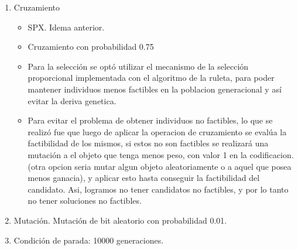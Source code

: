 \documentclass[9pt,conference]{IEEEtran}
\begin{document}
\begin{enumerate}
	\item Cruzamiento\\
		\begin{itemize}	
		\item SPX. Idema anterior.
		\item Cruzamiento con probabilidad 0.75

		\item Para la selección se optó utilizar el mecanismo de la selección proporcional implementada con el algoritmo de la ruleta, para poder mantener individuos menos factibles en la poblacion generacional y así evitar la deriva genetica.

		\item Para evitar el problema de obtener individuos no factibles, lo que se realizó fue que luego de aplicar la operacion de cruzamiento se evalúa la factibilidad de los mismos, si estos no son factibles se realizará una mutación a el objeto que tenga menos peso, con valor 1 en la codificacion. (otra opcion seria mutar algun objeto aleatoriamente o a aquel que posea menos ganacia), y aplicar esto hasta conseguir la factibilidad del candidato. Asi, logramos no tener candidatos no factibles, y por lo tanto no tener soluciones no factibles. 
		\end{itemize}	
	
	\item Mutación.
		Mutación de bit aleatorio con probabilidad 0.01.
	
	\item Condición de parada:
		10000 generaciones.
	\end{enumerate}

\end{document}
